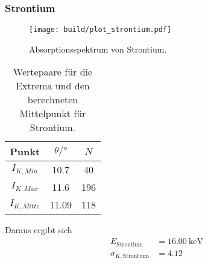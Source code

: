\clearpage
\subsubsection*{Strontium}
\begin{figure}[H]
    \centering
    \texttt{[image: build/plot\_strontium.pdf]}
    \caption{Absorptionsspektrum von Strontium.}
    \label{fig:strontium}
\end{figure}
\begin{table}[H]                                                                                   
    \centering                                                                                     
        \caption{Wertepaare für die Extrema und den berechneten Mittelpunkt für Strontium.}                      
        \label{tab:Sr}                                                                        
        \begin{tabular}{S S[table-format=2.2] S}                                                   
          \toprule                                                                                 
          {Punkt} & {$\theta /\si{\degree}$} & {$N$}\\                                            
          \midrule                                                                                 
          {$I_{K,Min  }$} &10.7&40\\
          {$I_{K,Max  }$} &11.6&196\\
          {$I_{K,Mitte}$} &11.09&118\\
          \bottomrule                                                                              
        \end{tabular}                                                                              
      \end{table}                                                                                  
Daraus ergibt sich                                                                                 
\begin{align*}                                                                                     
    E_\text{Strontium} &= \SI{16.00}{\kilo\electronvolt}\\                  
    \sigma_{K, \text{Strontium}} &= \num{4.12}                      
\end{align*}                                                                                       

